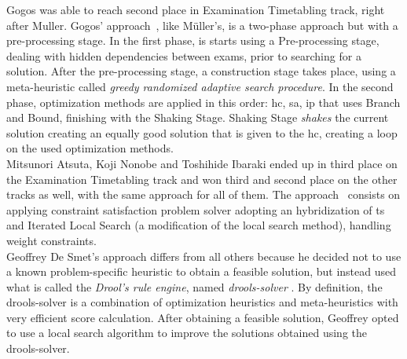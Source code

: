 
Gogos was able to reach second place in Examination Timetabling track, right after Muller. Gogos' approach~\cite{Gogos2012}, like M\"{u}ller's, is a two-phase approach but with a pre-processing stage. In the first phase, is starts using a Pre-processing stage, dealing with hidden dependencies between exams, prior to searching for a solution. After the pre-processing stage, a construction stage takes place, using a meta-heuristic called \textit{greedy randomized adaptive search procedure}. In the second phase, optimization methods are applied in this order: \gls{hc}, \gls{sa}, \gls{ip} that uses Branch and Bound, finishing with the Shaking Stage. Shaking Stage \textit{shakes} the current solution creating an equally good solution that is given to the \gls{hc}, creating a loop on the used optimization methods.\\

Mitsunori Atsuta, Koji Nonobe and Toshihide Ibaraki ended up in third place on the Examination Timetabling track and won third and second place on the other tracks as well, with the same approach for all of them. The approach~\cite{Atsuta2007} consists on applying constraint satisfaction problem solver adopting an hybridization of \gls{ts} and Iterated Local Search (a modification of the local search method), handling weight constraints.\\

Geoffrey De Smet's approach \cite{Smet2007} differs from all others because he decided not to use a known problem-specific heuristic to obtain a feasible solution, but instead used what is called the \textit{Drool's rule engine}, named \textit{drools-solver} \cite{Drools}. By definition, the drools-solver is a combination of optimization heuristics and meta-heuristics with very efficient score calculation. After obtaining a feasible solution, Geoffrey opted to use a local search algorithm to improve the solutions obtained using the drools-solver.\\

